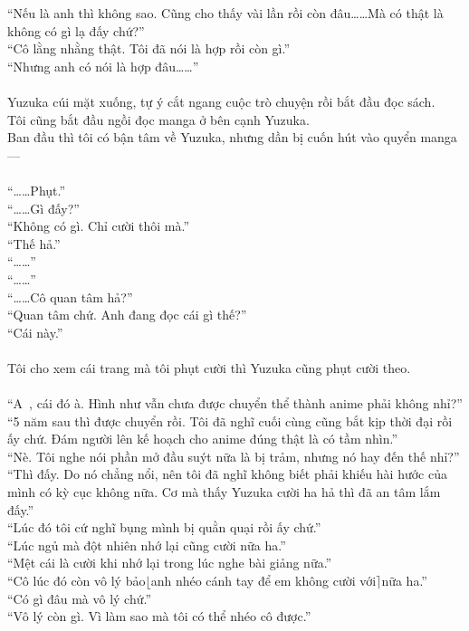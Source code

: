 \documentclass[12pt,a4paper, twosides]{book}
\begin{document}
“Nếu là anh thì không sao. Cũng cho thấy vài lần rồi còn đâu……Mà có thật là không có gì lạ đấy chứ?”\\
“Cô lằng nhằng thật. Tôi đã nói là hợp rồi còn gì.”\\
“Nhưng anh có nói là hợp đâu……”\\
\\
Yuzuka cúi mặt xuống, tự ý cắt ngang cuộc trò chuyện rồi bắt đầu đọc sách.\\
Tôi cũng bắt đầu ngồi đọc manga ở bên cạnh Yuzuka.\\
Ban đầu thì tôi có bận tâm về Yuzuka, nhưng dần bị cuốn hút vào quyển manga—\\
\\
“……Phụt.”\\
“……Gì đấy?”\\
“Không có gì. Chỉ cười thôi mà.”\\
“Thế hả.”\\
“……”\\
“……”\\
“……Cô quan tâm hả?”\\
“Quan tâm chứ. Anh đang đọc cái gì thế?”\\
“Cái này.”\\
\\
Tôi cho xem cái trang mà tôi phụt cười thì Yuzuka cũng phụt cười theo.\\
\\
“A~, cái đó à. Hình như vẫn chưa được chuyển thể thành anime phải không nhỉ?”\\
“5 năm sau thì được chuyển rồi. Tôi đã nghĩ cuối cùng cũng bắt kịp thời đại rồi ấy chứ. Đám người lên kế hoạch cho anime đúng thật là có tầm nhìn.”\\
“Nè. Tôi nghe nói phần mở đầu suýt nữa là bị trảm, nhưng nó hay đến thế nhỉ?”\\
“Thì đấy. Do nó chẳng nổi, nên tôi đã nghĩ không biết phải khiếu hài hước của mình có kỳ cục không nữa. Cơ mà thấy Yuzuka cười ha hả thì đã an tâm lắm đấy.”\\
“Lúc đó tôi cứ nghĩ bụng mình bị quằn quại rồi ấy chứ.”\\
“Lúc ngủ mà đột nhiên nhớ lại cũng cười nữa ha.”\\
“Mệt cái là cười khi nhớ lại trong lúc nghe bài giảng nữa.”\\
“Cô lúc đó còn vô lý bảo$\lfloor$anh nhéo cánh tay để em không cười với$\rceil$nữa ha.”\\
“Có gì đâu mà vô lý chứ.”\\
“Vô lý còn gì. Vì làm sao mà tôi có thể nhéo cô được.”\\
\end{document}
